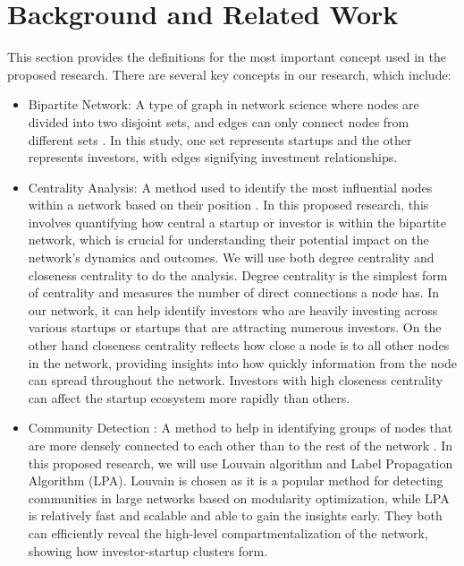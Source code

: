 \documentclass[a4paper,11pt]{article}
\begin{document}
\section{Background and Related Work}

This section provides the definitions for the most important concept used in the proposed research. There are several key concepts in our research, which include:
\begin{itemize}
    \item Bipartite Network: A type of graph in network science where nodes are divided into two disjoint sets, and edges can only connect nodes from different sets \cite{guillaume2005a}. In this study, one set represents startups and the other represents investors, with edges signifying investment relationships.
    \item Centrality Analysis: A method used to identify the most influential nodes within a network based on their position \cite{rodrigues2019a}. In this proposed research, this involves quantifying how central a startup or investor is within the bipartite network, which is crucial for understanding their potential impact on the network’s dynamics and outcomes. We will use both degree centrality and closeness centrality to do the analysis. Degree centrality is the simplest form of centrality and measures the number of direct connections a node has. In our network, it can help identify investors who are heavily investing across various startups or startups that are attracting numerous investors. On the other hand closeness centrality reflects how close a node is to all other nodes in the network, providing insights into how quickly information from the node can spread throughout the network. Investors with high closeness centrality can affect the startup ecosystem more rapidly than others.
    \item Community Detection : A method to help in identifying groups of nodes that are more densely connected to each other than to the rest of the network \cite{rodrigues2019a}. In this proposed research, we will use Louvain algorithm and Label Propagation Algorithm (LPA). Louvain is chosen as it is a popular method for detecting communities in large networks based on modularity optimization, while LPA is relatively fast and scalable and able to gain the insights early. They both can efficiently reveal the high-level compartmentalization of the network, showing how investor-startup clusters form.
\end{itemize}
\end{document}
